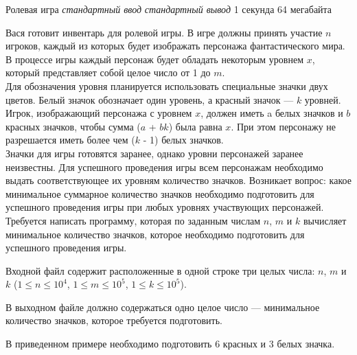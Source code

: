 \begin{problem}%
{Ролевая игра}%
{\textsl{стандартный ввод}}%
{\textsl{стандартный вывод}}%
{1 секунда}%
{64 мегабайта}{}

Вася готовит инвентарь для ролевой игры. В игре должны принять участие $n$ игроков, каждый из которых будет изображать персонажа фантастического мира. В процессе игры каждый персонаж будет обладать некоторым уровнем $x$, который представляет собой целое число от 1 до $m$.\\

Для обозначения уровня планируется использовать специальные значки двух цветов. Белый значок обозначает один уровень, а красный значок — $k$ уровней. Игрок, изображающий персонажа с уровнем $x$, должен иметь a белых значков и $b$ красных значков, чтобы сумма ($a$ + $bk$)  была равна $x$. При этом персонажу не разрешается иметь более чем ($k$ - 1)  белых значков.\\

Значки для игры готовятся заранее, однако уровни персонажей заранее неизвестны. Для успешного проведения игры всем персонажам необходимо выдать соответствующее их уровням количество значков. Возникает вопрос: какое минимальное суммарное количество значков необходимо подготовить для успешного проведения игры при любых уровнях участвующих персонажей.\\

Требуется написать программу, которая по заданным числам $n$, $m$ и $k$ вычисляет минимальное количество значков, которое необходимо подготовить для успешного проведения игры.

\InputFile

Входной файл содержит расположенные в одной строке три целых числа: $n$, $m$ и $k$ ($1 \le n \le 10^4$, $1 \le m \le 10^5$, $1 \le k \le 10^5$).

\OutputFile

В выходном файле должно содержаться одно целое число — минимальное количество значков, которое требуется подготовить.

\Examples

\begin{example}
%
\end{example}

\Explanation

В приведенном примере необходимо подготовить 6 красных и 3 белых значка.

\end{problem}